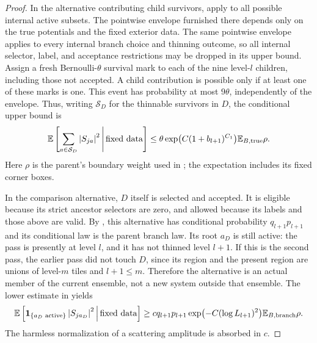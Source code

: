 \begin{proof}
In the alternative contributing child survivors, apply
 to all possible internal active subsets.  The
pointwise envelope furnished there depends only on the true potentials
and the fixed exterior data.  The same pointwise envelope applies to every
internal branch choice and thinning outcome, so all internal selector,
label, and acceptance restrictions may be dropped in its upper bound.
Assign a fresh Bernoulli-$\theta$ survival mark to each of the nine level-$l$ children,
including those not accepted.  A child contribution is possible only
if at least one of these marks is one.  This event has probability at
most $9\theta$, independently of the envelope.  Thus, writing
$\mathcal S_D$ for the thinnable survivors in $D$, the conditional
upper bound is
\begin{equation}
 \mathbb E\left[\sum_{a\in\mathcal S_D}\left\lvert S_{ja}\right\rvert^2
                              \,\middle|\,\text{fixed data}\right]
 \le\theta\exp\bigl(C(1+b_{l+1})^{C_1}\bigr)
                   \mathbb E_{B,\rm true}\rho.
 \label{hier:parent-upper}
\end{equation}
Here $\rho$ is the parent's boundary weight used in
; the expectation includes its fixed corner boxes.

In the comparison alternative, $D$ itself is selected and accepted.
It is eligible because its strict ancestor selectors are zero, and
allowed because its labels and those above are valid.  By
, this alternative has conditional probability
$q_{l+1}p_{l+1}$ and its conditional law is the parent branch law.
Its root $a_D$ is still active: the pass is presently at level $l$,
and it has not thinned level $l+1$.  If this is the second pass, the
earlier pass did not touch $D$, since its region and the present region
are unions of level-$m$ tiles and $l+1\le m$.  Therefore the alternative
is an actual member of the current ensemble, not a new system outside
that ensemble.  The lower estimate in  yields
\begin{equation}
 \mathbb E\left[\mathbf 1_{\{a_D\text{ active}\}}\left\lvert S_{j a_D}\right\rvert^2
                              \,\middle|\,\text{fixed data}\right]
 \ge c q_{l+1}p_{l+1}
        \exp\bigl(-C(\log L_{l+1})^2\bigr)
                   \mathbb E_{B,\rm branch}\rho.
 \label{hier:parent-lower}
\end{equation}
The harmless normalization of a scattering amplitude is absorbed in
$c$.


\end{proof}
